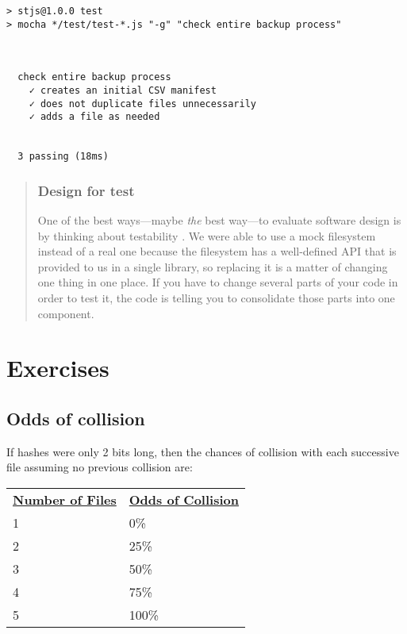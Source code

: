 \documentclass[krantzl]{krantz}
\newenvironment{callout}{\savenotes\begin{tBox}\begin{quotation}\toggletrue{inbox}\renewcommand{\thempfootnote}{\arabic{footnote}}}{\end{quotation}\vspace{\baselineskip}\end{tBox}\togglefalse{inbox}\spewnotes}
\begin{document}
\begin{lstlisting}[frame=single,frameround=tttt]
> stjs@1.0.0 test
> mocha */test/test-*.js "-g" "check entire backup process"



  check entire backup process
    ✓ creates an initial CSV manifest
    ✓ does not duplicate files unnecessarily
    ✓ adds a file as needed


  3 passing (18ms)
\end{lstlisting}


\begin{callout}


\subsubsection*{Design for test}


One of the best ways---maybe \emph{the} best way---to evaluate software design
is by thinking about testability \cite{Feathers2004}.
We were able to use a mock filesystem instead of a real one
because the filesystem has a well-defined API
that is provided to us in a single library,
so replacing it is a matter of changing one thing in one place.
If you have to change several parts of your code in order to test it,
the code is telling you to consolidate those parts into one component.

\end{callout}


\section{Exercises}\label{file-backup-exercises}

\subsection*{Odds of collision}


If hashes were only 2 bits long,
then the chances of collision with each successive file
assuming no previous collision are:


\vspace{\baselineskip}
\begin{tabular}{ll}
\textbf{\underline{Number of Files}} & \textbf{\underline{Odds of Collision}} \\
1 & 0\% \\
2 & 25\% \\
3 & 50\% \\
4 & 75\% \\
5 & 100\% \\
\end{tabular}
\end{document}
